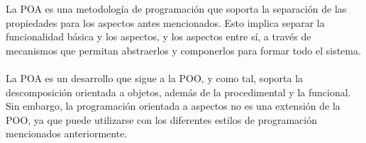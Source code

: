 La POA es una metodología de programación que soporta la
separación de las propiedades para los aspectos antes mencionados. Esto implica
separar la funcionalidad básica y los aspectos, y los aspectos entre sí, a través de
mecanismos que permitan abstraerlos y componerlos para formar todo el sistema.
\\\\

La POA es un desarrollo que sigue a la POO, y como tal, soporta la
descomposición orientada a objetos, además de la procedimental y la funcional. Sin
embargo, la programación orientada a aspectos no es una extensión de la POO, ya
que puede utilizarse con los diferentes estilos de programación mencionados
anteriormente.







